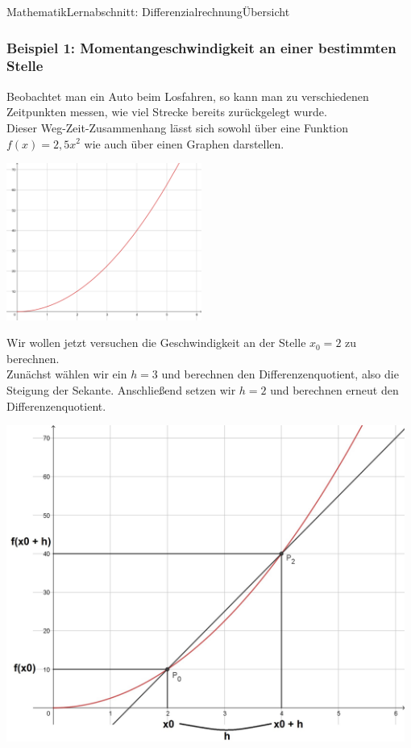 \documentclass[11pt,twocolumn,oneside,openany,headings=optiontotoc,11pt,numbers=noenddot,final]{article}
\begin{document}
\begin{worksheet}{Mathematik}{Lernabschnitt: Differenzialrechnung}{Übersicht}
		\subsubsection*{Beispiel 1: Momentangeschwindigkeit an einer bestimmten Stelle}
		Beobachtet man ein Auto beim Losfahren, so kann man zu verschiedenen Zeitpunkten messen, wie viel Strecke bereits zurückgelegt wurde.\\
		Dieser Weg-Zeit-Zusammenhang lässt sich sowohl über eine Funktion \(f(x) = 2,5x^2\) wie auch über einen Graphen darstellen.\\
		\par\noindent
		\includegraphics[width=0.48\textwidth]{../99_Bilder/04_AutoAnf.png}\\
		\par\noindent
		Wir wollen jetzt versuchen die Geschwindigkeit an der Stelle \(x_0 = 2\) zu berechnen.\\
		Zunächst wählen wir ein \(h = 3\) und berechnen den Differenzenquotient, also die Steigung der Sekante. Anschließend setzen wir \(h = 2\) und berechnen erneut den Differenzenquotient.\\
		\begin{minipage}{0.22\textwidth}
			\includegraphics[width=0.98\textwidth]{../99_Bilder/04_Skr_DiffQuo_2.jpg}

\end{minipage}
\end{worksheet}
\end{document}
